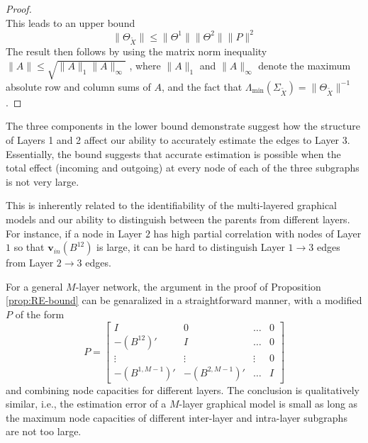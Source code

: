 \begin{proof}
\begin{equation*}
\end{equation*}
This leads to an upper bound  
\begin{equation*}
\| \Theta_{\widetilde{X}} \| \le \| \Theta^1 \| \| \Theta^2 \| \|P\|^2
\end{equation*}
The result then follows by using the matrix norm inequality $\|A\| \le \sqrt{\|A\|_1 \|A\|_{\infty}}$ \citep{golub2012matrix}, where $\|A\|_1$ and $\|A\|_{\infty}$ denote the maximum absolute row and column sums of $A$, and the fact that $\Lambda_{\min}(\Sigma_{\tilde{X}}) = \| \Theta_{\tilde{X}} \|^{-1}$. 
\end{proof}

The three components in the lower bound demonstrate suggest how the structure of Layers 1 and 2 affect our ability to accurately estimate the edges to Layer 3. Essentially, the bound suggests that accurate estimation is possible when the total effect (incoming and outgoing) at every node of each of the three subgraphs is not very large. 

This is inherently related to the identifiability of the multi-layered graphical models and our ability to distinguish between the parents from different layers. For instance, if a node in Layer $2$ has high partial correlation with nodes of Layer $1$ so that $\mathbf{v}_{in}(B^{12})$ is large, it can be hard to distinguish Layer $1 \rightarrow 3$ edges from Layer $2 \rightarrow 3$ edges.

For a general $M$-layer network, the argument in the proof of Proposition \ref{prop:RE-bound} can be genaralized in a straightforward manner, with a modified $P$ of the form 
\begin{equation*}
P = \left[\begin{array}{cccc}
I & 0 & \ldots & 0 \\ 
-(B^{12})' & I & \ldots & 0 \\
\vdots & \vdots & \vdots & 0 \\
-(B^{1, M-1})' & -(B^{2, M-1})' & \ldots & I
 \end{array} \right]
\end{equation*}
and combining node capacities for different layers. The conclusion is qualitatively similar, i.e., the estimation error of a $M$-layer graphical model is small as long as the maximum node capacities of different inter-layer and intra-layer subgraphs are not too large.
